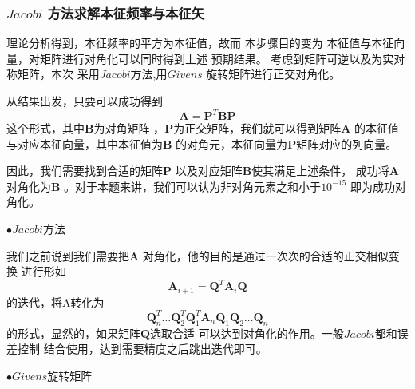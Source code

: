 \documentclass[11pt, a4paper, oneside]{ctexart}
\begin{document}
{{{    


        

\subsubsection{$Jacobi$ 方法求解本征频率与本征矢}

理论分析得到，本征频率的平方为本征值，故而
本步骤目的变为
本征值与本征向量，对矩阵进行对角化可以同时得到上述
预期结果。
考虑到矩阵可逆以及为实对称矩阵，本次
采用$Jacobi$方法,用$Givens$
旋转矩阵进行正交对角化。

从结果出发，只要可以成功得到
$$\boldsymbol{A}=\boldsymbol P^T \boldsymbol B \boldsymbol P$$
这个形式，其中$\boldsymbol B$为对角矩阵
，$\boldsymbol P$为正交矩阵，我们就可以得到矩阵$\boldsymbol A$
的本征值与对应本征向量，其中本征值为$\boldsymbol B$
的对角元，本征向量为$\boldsymbol P$矩阵对应的列向量。

因此，我们需要找到合适的矩阵$\boldsymbol P$
以及对应矩阵$\boldsymbol B$使其满足上述条件，
成功将$\boldsymbol A$对角化为$\boldsymbol B$
。对于本题来讲，我们可以认为非对角元素之和小于$10^{-15}$
即为成功对角化。

$\bullet Jacobi$方法

我们之前说到我们需要把$\boldsymbol A$
对角化，他的目的是通过一次次的合适的正交相似变换
进行形如
$$\boldsymbol A_{i+1}=\boldsymbol 
Q^T \boldsymbol {A}_i \boldsymbol Q$$
的迭代，将A转化为
$$\boldsymbol Q_n^T \dots\boldsymbol Q_2^T \boldsymbol Q_1^T 
\boldsymbol {A}_n 
\boldsymbol Q_1\boldsymbol Q_2\dots \boldsymbol Q_n$$
的形式，显然的，如果矩阵$\boldsymbol Q$选取合适
可以达到对角化的作用。一般$Jacobi$都和误差控制
结合使用，达到需要精度之后跳出迭代即可。

$\bullet Givens$旋转矩阵

}}}
\end{document}
